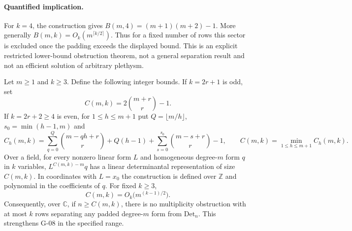 \paragraph{Quantified implication.}
For $k=4$, the construction gives $B(m,4)=(m+1)(m+2)-1$. More generally $B(m,k)=O_k(m^{\lceil k/2\rceil})$. Thus for a fixed number of rows this sector is excluded once the padding exceeds the displayed bound. This is an explicit restricted lower-bound obstruction theorem, not a general separation result and not an efficient solution of arbitrary plethysm.

\begin{proposition}\label{G-09}
Let $m\geq1$ and $k\geq3$. Define the following integer bounds. If $k=2r+1$ is odd, set
\[
 C(m,k)=2\binom{m+r}{r}-1.
\]
If $k=2r+2\geq4$ is even, for $1\leq h\leq m+1$ put $Q=\lfloor m/h\rfloor$, $s_0=\min(h-1,m)$ and
\[
 C_h(m,k)=\sum_{q=0}^{Q}\binom{m-qh+r}{r}+Q(h-1)
          +\sum_{s=0}^{s_0}\binom{m-s+r}{r}-1,
 \qquad C(m,k)=\min_{1\leq h\leq m+1}C_h(m,k).
\]
Over a field, for every nonzero linear form $L$ and homogeneous degree-$m$ form $q$ in $k$ variables, $L^{C(m,k)-m}q$ has a linear determinantal representation of size $C(m,k)$. In coordinates with $L=x_0$ the construction is defined over $\mathbb Z$ and polynomial in the coefficients of $q$. For fixed $k\geq3$,
\[
 C(m,k)=O_k\bigl(m^{(k-1)/2}\bigr).
\]
Consequently, over $\mathbb C$, if $n\geq C(m,k)$, there is no multiplicity obstruction with at most $k$ rows separating any padded degree-$m$ form from $\mathrm{Det}_n$. This strengthens G-08 in the specified range.
\end{proposition}
